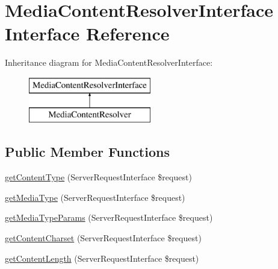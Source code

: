 \hypertarget{interface_pes_1_1_http_1_1_request_1_1_media_content_resolver_interface}{}\section{Media\+Content\+Resolver\+Interface Interface Reference}
\label{interface_pes_1_1_http_1_1_request_1_1_media_content_resolver_interface}
Inheritance diagram for Media\+Content\+Resolver\+Interface\+:\begin{figure}[H]
\begin{center}
\leavevmode
\includegraphics[height=2.000000cm]{interface_pes_1_1_http_1_1_request_1_1_media_content_resolver_interface}
\end{center}
\end{figure}
\subsection*{Public Member Functions}
\begin{DoxyCompactItemize}
\item 
\mbox{\hyperlink{interface_pes_1_1_http_1_1_request_1_1_media_content_resolver_interface_a5e069384f33f60671b832beae5260d9b}{get\+Content\+Type}} (Server\+Request\+Interface \$request)
\item 
\mbox{\hyperlink{interface_pes_1_1_http_1_1_request_1_1_media_content_resolver_interface_ae31cd4d8b2526963e57f814b543d2b52}{get\+Media\+Type}} (Server\+Request\+Interface \$request)
\item 
\mbox{\hyperlink{interface_pes_1_1_http_1_1_request_1_1_media_content_resolver_interface_af1d02209d81e589acebb7d0afecbe6da}{get\+Media\+Type\+Params}} (Server\+Request\+Interface \$request)
\item 
\mbox{\hyperlink{interface_pes_1_1_http_1_1_request_1_1_media_content_resolver_interface_a45eeebc3e157de436ba8b68241de2514}{get\+Content\+Charset}} (Server\+Request\+Interface \$request)
\item 
\mbox{\hyperlink{interface_pes_1_1_http_1_1_request_1_1_media_content_resolver_interface_aa5886a7afae000593a639e649d411ca5}{get\+Content\+Length}} (Server\+Request\+Interface \$request)
\end{DoxyCompactItemize}


